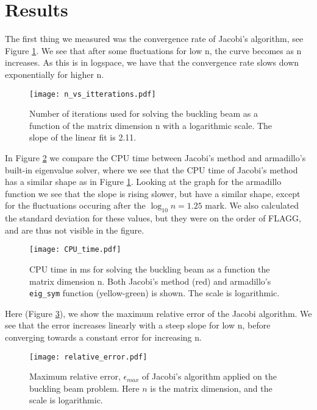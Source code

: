 \section{Results}
\label{sec:results}

The first thing we measured was the convergence rate of Jacobi's algorithm, see Figure \ref{fig:n_vs_it}.
We see that after some fluctuations for low n, the curve becomes as n increases.
As this is in logspace, we have that the convergence rate slows down exponentially
for higher n.
\begin{figure}[htbp]
	\centering
	\texttt{[image: n\_vs\_itterations.pdf]}
	\caption{Number of iterations used for solving the buckling beam as a function of the matrix dimension n with a logarithmic scale. The slope of the linear fit is 2.11.}
	\label{fig:n_vs_it}
\end{figure}

In Figure \ref{fig:CPUtime} we compare the CPU time between Jacobi's method and
armadillo's built-in eigenvalue solver, where we see that the CPU time of Jacobi's method
has a similar shape as in Figure \ref{fig:n_vs_it}. Looking at the graph for the armadillo
function we see that the slope is rising slower, but have a similar shape, except
for the fluctuations occuring after the $\log_{10} n = 1.25$ mark. We also calculated
the standard deviation for these values, but they were on the order of FLAGG, and
are thus not visible in the figure.
\begin{figure}[htbp]
	\centering
	\texttt{[image: CPU\_time.pdf]}
	\caption{CPU time in ms for solving the buckling beam as a function the matrix dimension n. Both Jacobi's method (red) and armadillo's \texttt{eig\_sym} function (yellow-green) is shown. The scale is logarithmic.}
	\label{fig:CPUtime}
\end{figure}

Here (Figure \ref{fig:error}), we show the maximum relative error of the Jacobi
algorithm. We see that the error increases linearly with a steep slope for low n,
before converging towards a constant error for increasing n.
\begin{figure}[htbp]
	\centering
	\texttt{[image: relative\_error.pdf]}
	\caption{Maximum relative error, $\epsilon_{max}$ of Jacobi's algorithm applied on the buckling beam problem.
	Here $n$ is the matrix dimension, and the scale is logarithmic.}
	\label{fig:error}
\end{figure}
